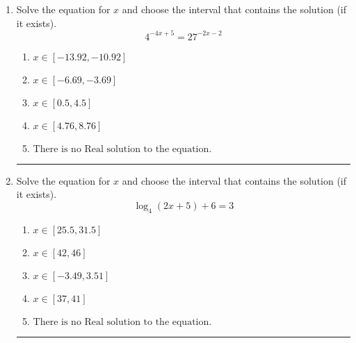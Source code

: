 \documentclass[14pt]{extbook}
\newcommand{\litem}[1]{\item#1\hspace*{-1cm}\rule{\textwidth}{0.4pt}}
\begin{document}
\begin{enumerate}
{\begin{enumerate}[label=\Alph*.]
\end{enumerate} }
\litem{
Solve the equation for $x$ and choose the interval that contains the solution (if it exists).\[ 4^{-4x+5} = 27^{-2x-2} \]\begin{enumerate}[label=\Alph*.]
\item \( x \in [-13.92, -10.92] \)
\item \( x \in [-6.69, -3.69] \)
\item \( x \in [0.5, 4.5] \)
\item \( x \in [4.76, 8.76] \)
\item \( \text{There is no Real solution to the equation.} \)

\end{enumerate} }
\litem{
Solve the equation for $x$ and choose the interval that contains the solution (if it exists).\[ \log_{4}{(2x+5)}+6 = 3 \]\begin{enumerate}[label=\Alph*.]
\item \( x \in [25.5, 31.5] \)
\item \( x \in [42, 46] \)
\item \( x \in [-3.49, 3.51] \)
\item \( x \in [37, 41] \)
\item \( \text{There is no Real solution to the equation.} \)

\end{enumerate} }
\end{enumerate}
\end{document}
